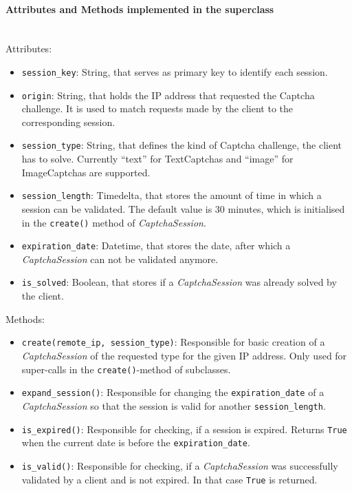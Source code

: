 \paragraph{Attributes and Methods implemented in the superclass} \mbox{} \\
Attributes:

\begin{itemize}
\item \verb|session_key|: String, that serves as primary key to identify each session. 
\item \verb|origin|: String, that holds the IP address that requested the Captcha challenge. It is used to match requests made by the client to the corresponding session.
\item \verb|session_type|: String, that defines the kind of Captcha challenge, the client has to solve. Currently ``text'' for TextCaptchas and ``image'' for ImageCaptchas are supported.
\item \verb|session_length|: Timedelta, that stores the amount of time in which a session can be validated. The default value is 30 minutes, which is initialised in the \verb|create()| method of \emph{CaptchaSession}.
\item \verb|expiration_date|: Datetime, that stores the date, after which a \emph{CaptchaSession} can not be validated anymore.
\item \verb|is_solved|: Boolean, that stores if a \emph{CaptchaSession} was already solved by the client.
\end{itemize}

Methods:

\begin{itemize} 
\item \verb|create(remote_ip, session_type)|: Responsible for basic creation of a \emph{CaptchaSession} of the requested type for the given IP address. Only used for super-calls in the \verb|create()|-method of subclasses.
\item \verb|expand_session()|: Responsible for changing the \verb|expiration_date| of a \emph{CaptchaSession} so that the session is valid for another \verb|session_length|.
\item \verb|is_expired()|: Responsible for checking, if a session is expired. Returns \verb|True| when the current date is before the \verb|expiration_date|.
\item \verb|is_valid()|: Responsible for checking, if a \emph{CaptchaSession} was successfully validated by a client and is not expired. In that case \verb|True| is returned.
\end{itemize}

